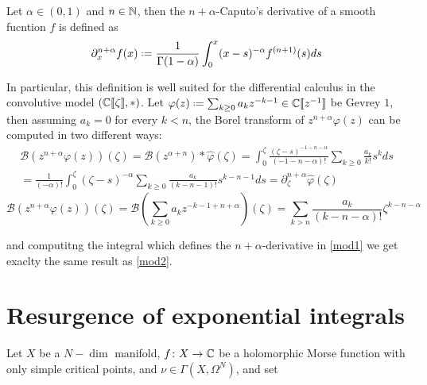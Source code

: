 \documentclass[11pt,a4paper,twoside,leqno,noamsfonts]{amsart}
\numberwithin{equation}{section}
\begin{document}
\begin{definition}
Let $\alpha\in (0,1)$ and $n\in\mathbb N$, then the $n+\alpha$-Caputo's derivative of a smooth fucntion $f$ is defined as
\begin{equation}
\partial_x^{n+\alpha}f(x)\defeq\frac{1}{\Gamma(1-\alpha)}\int_0^x(x-s)^{-\alpha}f^{(n+1)}(s)ds
\end{equation}
\end{definition}

In particular, this definition is well suited for the differential calculus in the convolutive model $\left(\mathbb C[\![\zeta]\!], \ast\right)$. Let $\varphi(z)\defeq\sum_{k\geq 0}a_kz^{-k-1}\in\C[\![z^{-1}]\!]$ be Gevrey $1$, then assuming $a_k=0$ for every $k<n$, the Borel transform of $z^{n+\alpha}\varphi(z)$ can be computed in two different ways:
\begin{multline}
\label{mod1}
\mathcal{B}\left(z^{n+\alpha}\varphi(z)\right)(\zeta)=\mathcal{B}(z^{\alpha+n})\ast\hat{\varphi}(\zeta)=\int_0^{\zeta}\frac{(\zeta-s)^{-1-n-\alpha}}{(-1-n-\alpha)!}\sum_{k\geq 0}\frac{a_k}{k!}s^{k}ds\\
=\frac{1}{(-\alpha)!}\int_0^{\zeta}(\zeta-s)^{-\alpha}\sum_{k\geq 0}\frac{a_k}{(k-n-1)!}s^{k-n-1}ds=\partial_{\zeta}^{n+\alpha}\hat{\varphi}(\zeta)
\end{multline}
\begin{equation}
\label{mod2}
\mathcal{B}\left(z^{n+\alpha}\varphi(z)\right)(\zeta)=\mathcal{B}\left(\sum_{k\geq 0}a_kz^{-k-1+n+\alpha}\right)(\zeta)=\sum_{k>n}\frac{a_k}{(k-n-\alpha)!}\zeta^{k-n-\alpha}
\end{equation}

and computitng the integral which defines the $n+\alpha$-derivative in \eqref{mod1} we get exaclty the same result as \eqref{mod2}.  

\section{Resurgence of exponential integrals}


Let $X$ be a $N-\dim$ manifold, $f\colon X\to\mathbb C$ be a holomorphic Morse function with only simple critical points, and $\nu\in\Gamma(X,\Omega^N)$, and set 
\end{document}
